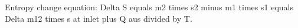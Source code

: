 Entropy change equation:  
Delta S equals m2 times s2 minus m1 times s1 equals Delta m12 times s at inlet plus Q aus divided by T.